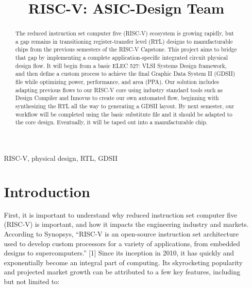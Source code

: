 \documentclass[conference]{IEEEtran}
\begin{document}
\title{RISC-V: ASIC-Design Team}

\author{
\and
{}
}

\maketitle

\begin{abstract}
The reduced instruction set computer five (RISC-V) ecosystem is growing rapidly, but a gap remains in transitioning register-transfer level (RTL) designs to manufacturable chips from the previous semesters of the RISC-V Capstone. This project aims to bridge that gap by implementing a complete application-specific integrated circuit physical design flow. It will begin from a basic ELEC 527: VLSI Systems Design framework, and then define a custom process to achieve the final Graphic Data System II (GDSII) file while optimizing power, performance, and area (PPA). Our solution includes adapting previous flows to our RISC-V core using industry standard tools such as Design Compiler and Innovus to create our own automated flow, beginning with synthesizing the RTL all the way to generating a GDSII layout. By next semester, our workflow will be completed using the basic substitute file and it should be adapted to the core design. Eventually, it will be taped out into a manufacturable chip.
\end{abstract}

\begin{IEEEkeywords}
RISC-V, physical design, RTL, GDSII
\end{IEEEkeywords}

\section{Introduction}
First, it is important to understand why reduced instruction set computer five (RISC-V) is important, and how it impacts the engineering industry and markets. According to Synopsys, “RISC-V is an open-source instruction set architecture used to develop custom processors for a variety of applications, from embedded designs to supercomputers.” [1] Since its inception in 2010, it has quickly and exponentially become an integral part of computing. Its skyrocketing popularity and projected market growth can be attributed to a few key features, including but not limited to: 
\end{document}
